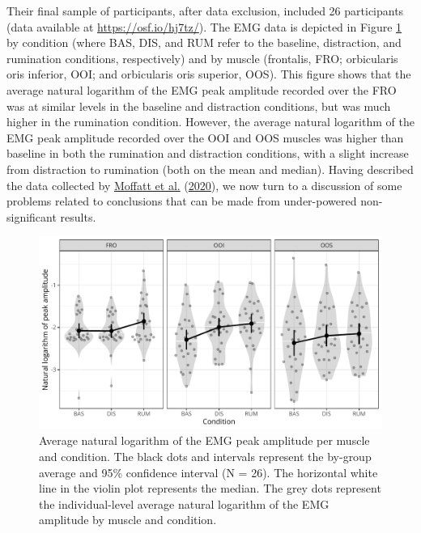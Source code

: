 \documentclass[
  english,
  man, donotrepeattitle,mask,floatsintext]{apa6}
\begin{document}
Their final sample of participants, after data exclusion, included 26 participants (data available at \url{https://osf.io/hj7tz/}). The EMG data is depicted in Figure \ref{fig:general} by condition (where BAS, DIS, and RUM refer to the baseline, distraction, and rumination conditions, respectively) and by muscle (frontalis, FRO; orbicularis oris inferior, OOI; and orbicularis oris superior, OOS). This figure shows that the average natural logarithm of the EMG peak amplitude recorded over the FRO was at similar levels in the baseline and distraction conditions, but was much higher in the rumination condition. However, the average natural logarithm of the EMG peak amplitude recorded over the OOI and OOS muscles was higher than baseline in both the rumination and distraction conditions, with a slight increase from distraction to rumination (both on the mean and median). Having described the data collected by \protect\hyperlink{ref-moffatt_inner_2020}{Moffatt et al.} (\protect\hyperlink{ref-moffatt_inner_2020}{2020}), we now turn to a discussion of some problems related to conclusions that can be made from under-powered non-significant results.

\begin{figure}[!htb]

{\centering \includegraphics[width=1\linewidth]{manuscript_files/figure-latex/general-1} 

}

\caption{Average natural logarithm of the EMG peak amplitude per muscle and condition. The black dots and intervals represent the by-group average and 95\% confidence interval (N = 26). The horizontal white line in the violin plot represents the median. The grey dots represent the individual-level average natural logarithm of the EMG amplitude by muscle and condition.}\label{fig:general}
\end{figure}
\end{document}
